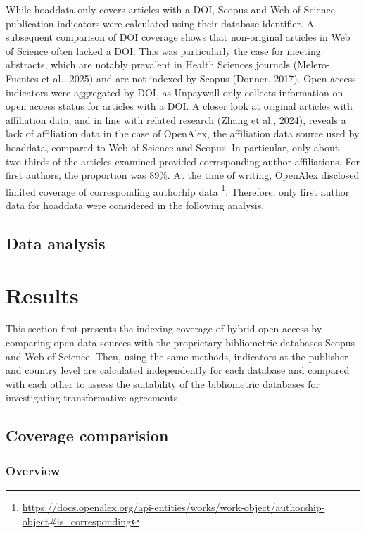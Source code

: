 \documentclass[a4paper,man,floatsintext,longtable,noextraspace,10pt]{apa6}
\begin{document}
While hoaddata only covers articles with a DOI, Scopus and Web of
Science publication indicators were calculated using their database
identifier. A subsequent comparison of DOI coverage shows that
non-original articles in Web of Science often lacked a DOI. This was
particularly the case for meeting abstracts, which are notably prevalent
in Health Sciences journals (Melero-Fuentes et al., 2025) and are not
indexed by Scopus (Donner, 2017). Open access indicators were aggregated
by DOI, as Unpaywall only collects information on open access status for
articles with a DOI. A closer look at original articles with affiliation
data, and in line with related research (Zhang et al., 2024), reveals a
lack of affiliation data in the case of OpenAlex, the affiliation data
source used by hoaddata, compared to Web of Science and Scopus. In
particular, only about two-thirds of the articles examined provided
corresponding author affiliations. For first authors, the proportion was
89\%. At the time of writing, OpenAlex disclosed limited coverage of
corresponding authorhip data \footnote{\url{https://docs.openalex.org/api-entities/works/work-object/authorship-object\#is_corresponding}}.
Therefore, only first author data for hoaddata were considered in the
following analysis.

\subsection{Data analysis}\label{data-analysis}

\section{Results}\label{results}

This section first presents the indexing coverage of hybrid open access
by comparing open data sources with the proprietary bibliometric
databases Scopus and Web of Science. Then, using the same methods,
indicators at the publisher and country level are calculated
independently for each database and compared with each other to assess
the suitability of the bibliometric databases for investigating
transformative agreements.

\subsection{Coverage comparision}\label{coverage-comparision}

\subsubsection{Overview}\label{overview}
\end{document}
